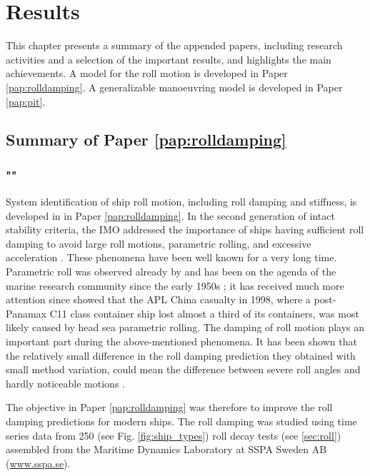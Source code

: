 \chapter{Results\label{ch:results}}
This chapter presents a summary of the appended papers, including research activities
and a selection of the important results, and highlights the main achievements. A model for the roll motion is developed in Paper \ref{pap:rolldamping}. A generalizable manoeuvring model is developed in Paper \ref{pap:pit}.

\section{Summary of Paper \ref{pap:rolldamping}}
\subsection*{""}
System identification of ship roll motion, including roll damping and stiffness, is developed in in Paper \ref{pap:rolldamping}. In the second generation of intact stability criteria, the IMO addressed the importance of ships having sufficient roll damping to avoid large roll motions, parametric rolling, and excessive acceleration \parencite{imo_finalization_2016}. These phenomena have been well known for a very long time. Parametric roll was observed already by \parencite{froude_rolling_1861} and has been on the agenda of the marine research community since the early 1950s \parencite{galeazzi_early_2013}; it has received much more attention since \parencite{france_investigation_2001} showed that the APL China casualty in 1998, where a post-Panamax C11 class container ship lost almost a third of its containers, was most likely caused by head sea parametric rolling. The damping of roll motion plays an important part during the above-mentioned phenomena. It has been shown that the relatively small difference in the roll damping prediction they obtained with small method variation, could mean the difference between severe roll angles and hardly noticeable motions \parencite{soder_ikeda_2019}.

The objective in Paper \ref{pap:rolldamping} was therefore to improve the roll damping predictions for modern ships. The roll damping was studied using time series data from 250 (see Fig. \ref{fig:ship_types}) roll decay tests (see \autoref{sec:roll}) assembled from the Maritime Dynamics Laboratory at SSPA Sweden AB (\href{www.sspa.se}{www.sspa.se}).

